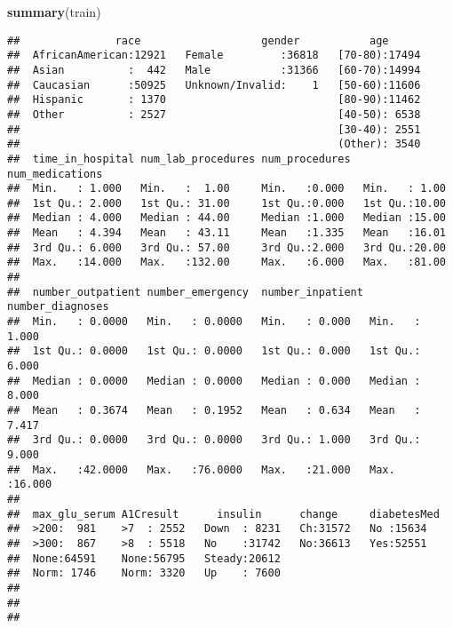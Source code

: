 \documentclass[]{article}
\newenvironment{Shaded}{\begin{snugshade}}{\end{snugshade}}
\newcommand{\KeywordTok}[1]{\textcolor[rgb]{0.13,0.29,0.53}{\textbf{#1}}}
\newcommand{\NormalTok}[1]{#1}
\begin{document}
\begin{Shaded}
\begin{Highlighting}[]
\KeywordTok{summary}\NormalTok{(train)}
\end{Highlighting}
\end{Shaded}

\begin{verbatim}
##               race                   gender           age       
##  AfricanAmerican:12921   Female         :36818   [70-80):17494  
##  Asian          :  442   Male           :31366   [60-70):14994  
##  Caucasian      :50925   Unknown/Invalid:    1   [50-60):11606  
##  Hispanic       : 1370                           [80-90):11462  
##  Other          : 2527                           [40-50): 6538  
##                                                  [30-40): 2551  
##                                                  (Other): 3540  
##  time_in_hospital num_lab_procedures num_procedures  num_medications
##  Min.   : 1.000   Min.   :  1.00     Min.   :0.000   Min.   : 1.00  
##  1st Qu.: 2.000   1st Qu.: 31.00     1st Qu.:0.000   1st Qu.:10.00  
##  Median : 4.000   Median : 44.00     Median :1.000   Median :15.00  
##  Mean   : 4.394   Mean   : 43.11     Mean   :1.335   Mean   :16.01  
##  3rd Qu.: 6.000   3rd Qu.: 57.00     3rd Qu.:2.000   3rd Qu.:20.00  
##  Max.   :14.000   Max.   :132.00     Max.   :6.000   Max.   :81.00  
##                                                                     
##  number_outpatient number_emergency  number_inpatient number_diagnoses
##  Min.   : 0.0000   Min.   : 0.0000   Min.   : 0.000   Min.   : 1.000  
##  1st Qu.: 0.0000   1st Qu.: 0.0000   1st Qu.: 0.000   1st Qu.: 6.000  
##  Median : 0.0000   Median : 0.0000   Median : 0.000   Median : 8.000  
##  Mean   : 0.3674   Mean   : 0.1952   Mean   : 0.634   Mean   : 7.417  
##  3rd Qu.: 0.0000   3rd Qu.: 0.0000   3rd Qu.: 1.000   3rd Qu.: 9.000  
##  Max.   :42.0000   Max.   :76.0000   Max.   :21.000   Max.   :16.000  
##                                                                       
##  max_glu_serum A1Cresult      insulin      change     diabetesMed
##  >200:  981    >7  : 2552   Down  : 8231   Ch:31572   No :15634  
##  >300:  867    >8  : 5518   No    :31742   No:36613   Yes:52551  
##  None:64591    None:56795   Steady:20612                         
##  Norm: 1746    Norm: 3320   Up    : 7600                         
##                                                                  
##                                                                  
##                                                                  

\end{verbatim}
\end{document}
